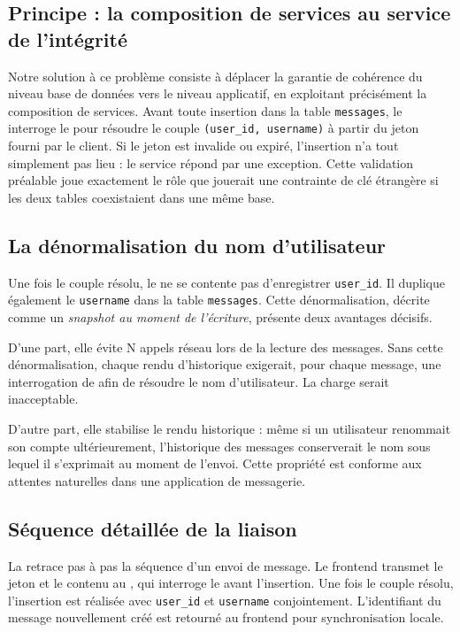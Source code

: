 \subsection{Principe : la composition de services au service de l'intégrité}

Notre solution à ce problème consiste à déplacer la garantie de cohérence du niveau base de données vers le niveau applicatif, en exploitant précisément la composition de services. Avant toute insertion dans la table \texttt{messages}, le  interroge le  pour résoudre le couple \texttt{(user\_id, username)} à partir du jeton fourni par le client. Si le jeton est invalide ou expiré, l'insertion n'a tout simplement pas lieu : le service répond par une exception. Cette validation préalable joue exactement le rôle que jouerait une contrainte de clé étrangère si les deux tables coexistaient dans une même base.

\subsection{La dénormalisation du nom d'utilisateur}

Une fois le couple résolu, le  ne se contente pas d'enregistrer \texttt{user\_id}. Il duplique également le \texttt{username} dans la table \texttt{messages}. Cette dénormalisation, décrite comme un \emph{snapshot au moment de l'écriture}, présente deux avantages décisifs.

D'une part, elle évite N appels réseau lors de la lecture des messages. Sans cette dénormalisation, chaque rendu d'historique exigerait, pour chaque message, une interrogation de  afin de résoudre le nom d'utilisateur. La charge serait inacceptable.

D'autre part, elle stabilise le rendu historique : même si un utilisateur renommait son compte ultérieurement, l'historique des messages conserverait le nom sous lequel il s'exprimait au moment de l'envoi. Cette propriété est conforme aux attentes naturelles dans une application de messagerie.

\subsection{Séquence détaillée de la liaison}

La  retrace pas à pas la séquence d'un envoi de message. Le frontend transmet le jeton et le contenu au , qui interroge le  avant l'insertion. Une fois le couple résolu, l'insertion est réalisée avec \texttt{user\_id} et \texttt{username} conjointement. L'identifiant du message nouvellement créé est retourné au frontend pour synchronisation locale.

